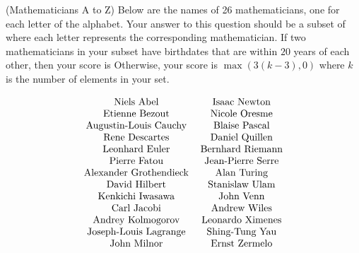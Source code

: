 (Mathematicians A to Z) Below are the names of 26 mathematicians, one for each letter of the alphabet.  Your answer to this question should be a subset of  where each letter represents the corresponding mathematician.  If two mathematicians in your subset have birthdates that are within $20$ years of each other, then your score is  Otherwise, your score is $\max(3(k-3),0)$ where $k$ is the number of elements in your set.

\[\begin{tabular}{cc}Niels Abel & Isaac Newton\\Etienne Bezout & Nicole Oresme \\ Augustin-Louis Cauchy & Blaise Pascal \\ Rene Descartes & Daniel Quillen \\ Leonhard Euler & Bernhard Riemann\\ Pierre Fatou & Jean-Pierre Serre \\ Alexander Grothendieck & Alan Turing \\ David Hilbert & Stanislaw Ulam \\ Kenkichi Iwasawa & John Venn \\ Carl Jacobi & Andrew Wiles \\ Andrey Kolmogorov & Leonardo Ximenes \\ Joseph-Louis Lagrange & Shing-Tung Yau \\ John Milnor & Ernst Zermelo\end{tabular}\]